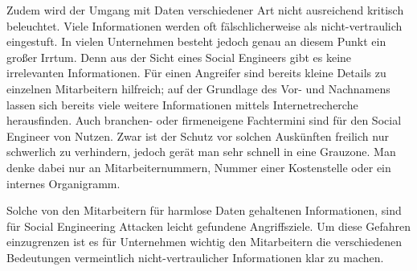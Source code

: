 Zudem wird der Umgang mit Daten verschiedener Art nicht ausreichend kritisch beleuchtet.
Viele Informationen werden oft fälschlicherweise als nicht-vertraulich eingestuft.
In vielen Unternehmen besteht jedoch genau an diesem Punkt ein großer Irrtum.
Denn aus der Sicht eines Social Engineers gibt es keine irrelevanten Informationen.
Für einen Angreifer sind bereits kleine Details zu einzelnen Mitarbeitern hilfreich; auf der Grundlage des Vor- und Nachnamens lassen sich bereits viele weitere Informationen mittels Internetrecherche herausfinden.
Auch branchen- oder firmeneigene Fachtermini sind für den Social Engineer von Nutzen.
Zwar ist der Schutz vor solchen Auskünften freilich nur schwerlich zu verhindern, jedoch gerät man sehr schnell in eine Grauzone.
Man denke dabei nur an Mitarbeiternummern, Nummer einer Kostenstelle oder ein internes Organigramm.

Solche von den Mitarbeitern für harmlose Daten gehaltenen Informationen, sind für Social Engineering Attacken leicht gefundene Angriffsziele.
Um diese Gefahren einzugrenzen ist es für Unternehmen wichtig den Mitarbeitern die verschiedenen Bedeutungen vermeintlich nicht-vertraulicher Informationen klar zu machen.
\citep{human-hacking} \citep{mitnick2006kunst}
